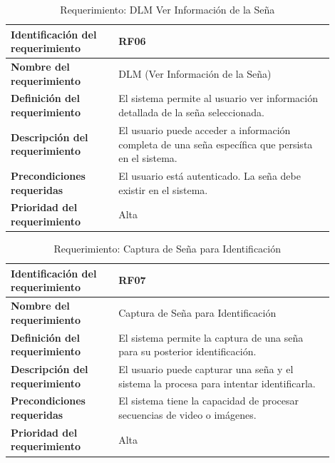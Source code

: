 \begin{table}[H]
    \centering
    \begin{tabular}{|p{0.3\linewidth}|p{0.6\linewidth}|}
        \hline
        \textbf{Identificación del requerimiento} & RF06 \\
        \hline
        \textbf{Nombre del requerimiento} & DLM (Ver Información de la Seña) \\
        \hline
        \textbf{Definición del requerimiento} & El sistema permite al usuario ver información detallada de la seña seleccionada. \\
        \hline
        \textbf{Descripción del requerimiento} & El usuario puede acceder a información completa de una seña específica que persista en el sistema. \\
        \hline
        \textbf{Precondiciones requeridas} & El usuario está autenticado. La seña debe existir en el sistema. \\
        \hline
        \textbf{Prioridad del requerimiento} & Alta \\
        \hline
    \end{tabular}
    \caption{Requerimiento: DLM Ver Información de la Seña}
    \label{tab:rf-dlm-ver-informacion}
\end{table}

\begin{table}[H]
    \centering
    \begin{tabular}{|p{0.3\linewidth}|p{0.6\linewidth}|}
        \hline
        \textbf{Identificación del requerimiento} & RF07 \\
        \hline
        \textbf{Nombre del requerimiento} & Captura de Seña para Identificación \\
        \hline
        \textbf{Definición del requerimiento} & El sistema permite la captura de una seña para su posterior identificación. \\
        \hline
        \textbf{Descripción del requerimiento} & El usuario puede capturar una seña y el sistema la procesa para intentar identificarla. \\
        \hline
        \textbf{Precondiciones requeridas} & El sistema tiene la capacidad de procesar secuencias de video o imágenes. \\
        \hline
        \textbf{Prioridad del requerimiento} & Alta \\
        \hline
    \end{tabular}
    \caption{Requerimiento: Captura de Seña para Identificación}
    \label{tab:rf-captura-sena-identificar}
\end{table}


